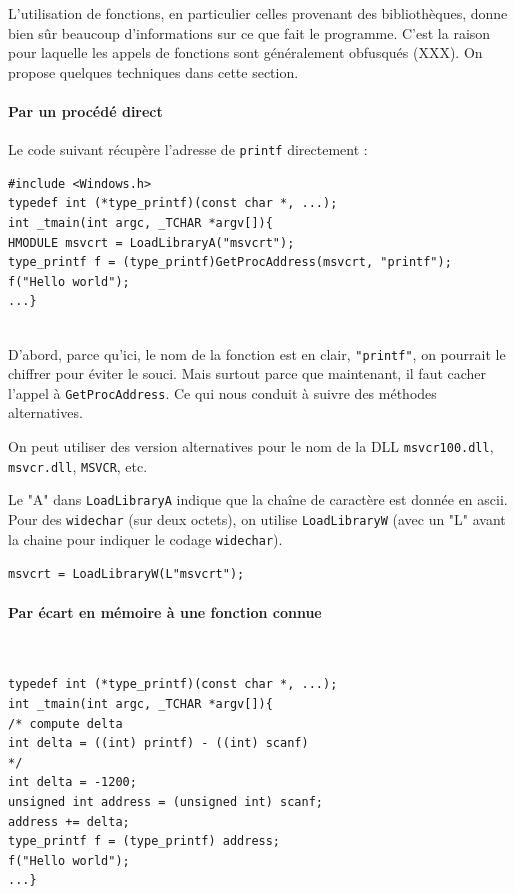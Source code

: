 \documentclass{book}
\newenvironment{commentaire}[1]{%
	\def\FrameCommand{\fboxrule=\FrameRule\fboxsep=\FrameSep \fcolorbox{yellow!50}{yellow!10}}%
	\MakeFramed {\advance\hsize-\width \FrameRestore}
	\noindent {\bf #1}\\
}%
{\endMakeFramed}
\newcommand{\code}[1]{\texttt{#1}}
\begin{document}
L'utilisation de fonctions, en particulier celles provenant des bibliothèques, donne bien sûr beaucoup d'informations sur ce que fait le programme. C'est la raison pour laquelle les appels de fonctions sont généralement obfusqués (XXX). On propose quelques techniques dans cette section. 

\paragraph{Par un procédé direct}

Le code suivant récupère l'adresse de \code{printf} directement : 

\begin{verbatim}
#include <Windows.h>
typedef int (*type_printf)(const char *, ...);
int _tmain(int argc, _TCHAR *argv[]){
HMODULE msvcrt = LoadLibraryA("msvcrt");
type_printf f = (type_printf)GetProcAddress(msvcrt, "printf");
f("Hello world");
...}
\end{verbatim}

\begin{commentaire}{Mais, ce n'est pas très discret}
	D'abord, parce qu'ici, le nom de la fonction est en clair, \code{"printf"}, on pourrait le chiffrer pour éviter le souci. Mais surtout parce que maintenant, il faut cacher l'appel à \code{GetProcAddress}. Ce qui nous conduit à suivre des méthodes alternatives. 
	
	\medskip On peut utiliser des version alternatives pour le nom de la DLL \code{msvcr100.dll}, \code{msvcr.dll}, \code{MSVCR}, etc. 
	
	\medskip Le "A" dans \code{LoadLibraryA} indique que la chaîne de caractère est donnée en {\sc ascii}. Pour des \code{widechar} (sur deux octets), on utilise \code{LoadLibraryW} (avec un "L" avant la chaine pour indiquer le codage \code{widechar}). 
	
	\vspace{1ex}
\noindent	\texttt{msvcrt = LoadLibraryW(L"msvcrt");}
\end{commentaire}

\paragraph{Par écart en mémoire à une fonction connue}{~}

\begin{verbatim}
typedef int (*type_printf)(const char *, ...);
int _tmain(int argc, _TCHAR *argv[]){
/* compute delta 
int delta = ((int) printf) - ((int) scanf)
*/
int delta = -1200;
unsigned int address = (unsigned int) scanf;
address += delta;
type_printf f = (type_printf) address;
f("Hello world");
...}
\end{verbatim}
\end{document}
